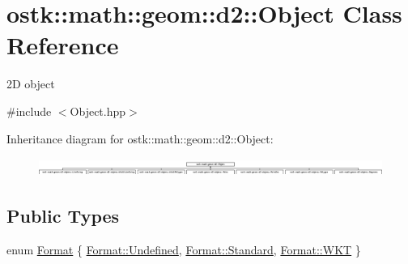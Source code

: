 \hypertarget{classostk_1_1math_1_1geom_1_1d2_1_1_object}{}\section{ostk\+:\+:math\+:\+:geom\+:\+:d2\+:\+:Object Class Reference}
\label{classostk_1_1math_1_1geom_1_1d2_1_1_object}


2D object  




{\ttfamily \#include $<$Object.\+hpp$>$}

Inheritance diagram for ostk\+:\+:math\+:\+:geom\+:\+:d2\+:\+:Object\+:\begin{figure}[H]
\begin{center}
\leavevmode
\includegraphics[height=0.601504cm]{classostk_1_1math_1_1geom_1_1d2_1_1_object}
\end{center}
\end{figure}
\subsection*{Public Types}
\begin{DoxyCompactItemize}
\item 
enum \hyperlink{classostk_1_1math_1_1geom_1_1d2_1_1_object_aa76f9e30caebf4005bafbdff447f66cf}{Format} \{ \hyperlink{classostk_1_1math_1_1geom_1_1d2_1_1_object_aa76f9e30caebf4005bafbdff447f66cfaec0fc0100c4fc1ce4eea230c3dc10360}{Format\+::\+Undefined}, 
\hyperlink{classostk_1_1math_1_1geom_1_1d2_1_1_object_aa76f9e30caebf4005bafbdff447f66cfaeb6d8ae6f20283755b339c0dc273988b}{Format\+::\+Standard}, 
\hyperlink{classostk_1_1math_1_1geom_1_1d2_1_1_object_aa76f9e30caebf4005bafbdff447f66cfa9ab05752e6beff2c783a6046ed592661}{Format\+::\+W\+KT}
 \}
\end{DoxyCompactItemize}
